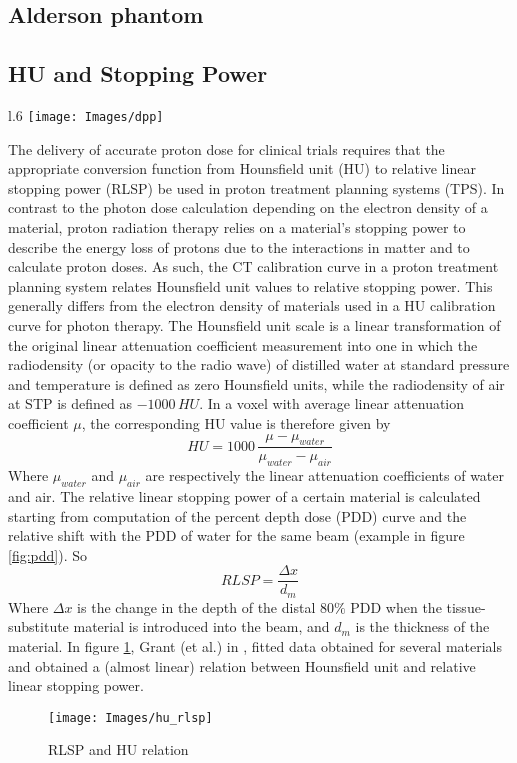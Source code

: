 \documentclass[12pt, a4paper, twoside]{book}
\begin{document}
\subsection{Alderson phantom}

\newpage
\subsection{HU and Stopping Power}
\begin{wrapfigure}{l}{.6\textwidth}
{\texttt{[image: Images/dpp]}}
\caption{PDD example}
\label{fig:pdd}
\end{wrapfigure}
The delivery of accurate proton dose for clinical trials requires that the appropriate conversion function from Hounsfield unit (HU) to relative linear stopping power (RLSP) be used in proton treatment planning systems (TPS). 
In contrast to the photon dose calculation depending on the electron density of a material, proton radiation therapy relies on a material's stopping power to describe the energy loss of protons due to the interactions in matter and to calculate proton doses. As such, the CT calibration curve in a proton treatment planning system relates Hounsfield unit values to relative stopping power. This generally differs from the electron density of materials used in a HU calibration curve for photon therapy. 
The Hounsfield unit scale is a linear transformation of the original linear attenuation coefficient measurement into one in which the radiodensity (or opacity to the radio wave) of distilled water at standard pressure and temperature is defined as zero Hounsfield units, while the radiodensity of air at STP is defined as $-1000\, HU$. In a voxel with average linear attenuation coefficient $\mu$, the corresponding HU value is therefore given by
\[
HU=1000\,\frac {\mu -\mu _{water}}{\mu _{water}-\mu _{air}}
\]
Where $\mu _{water}$ and $\mu _{air}$ are respectively the linear attenuation coefficients of water and air.
The relative linear stopping power of a certain material is calculated starting from computation of the percent depth dose (PDD) curve and the relative shift with the PDD of water for the same beam (example in figure \ref{fig:pdd}).
So
\[
RLSP = \frac{\Delta x}{d_m}
\]
Where $\Delta x$ is the change in the depth of the distal $80\%$ PDD when the tissue-substitute material is introduced into the beam, and $d_m$ is the thickness of the material.
In figure \ref{fig:HU}, Grant (et al.) in \cite{gra:hu}, fitted data obtained for several materials and obtained a (almost linear) relation between Hounsfield unit and relative linear stopping power.
\begin{figure}[t!]
\centering
{\texttt{[image: Images/hu\_rlsp]}}
\caption{RLSP and HU relation }
\label{fig:HU}
\end{figure}
\end{document}
